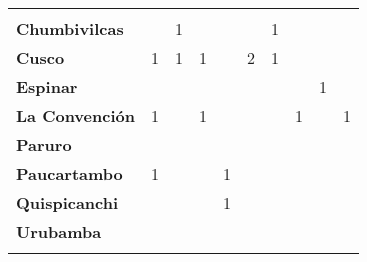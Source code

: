 \begin{tabular}{lccccccccc}
	&\cellcolor[HTML]{FCC46C}\\
	\textbf{Chumbivilcas}                      												
	&\cellcolor[HTML]{FCC46C}
	&1											&\cellcolor[HTML]{FCC46C}
	&\cellcolor[HTML]{FCC46C}					&\cellcolor[HTML]{FCC46C}
	&1											&\cellcolor[HTML]{FCC46C}
	&\cellcolor[HTML]{FCC46C}					&\cellcolor[HTML]{FCC46C}\\
	\textbf{Cusco}                            							
	&1
	&1											&1
	&\cellcolor[HTML]{FCC46C}					&2
	&1											&\cellcolor[HTML]{FCC46C}
	&\cellcolor[HTML]{FCC46C}					&\cellcolor[HTML]{FCC46C}\\
	\textbf{Espinar}       					             									&\cellcolor[HTML]{FCC46C} 					&\cellcolor[HTML]{FCC46C}					&\cellcolor[HTML]{FCC46C}					&\cellcolor[HTML]{FCC46C}					&\cellcolor[HTML]{FCC46C}					&\cellcolor[HTML]{FCC46C}					&\cellcolor[HTML]{FCC46C}					&1					&\cellcolor[HTML]{FCC46C}\\
	\textbf{La Convención}                      					
	&1											&\cellcolor[HTML]{FCC46C}					&1											&\cellcolor[HTML]{FCC46C}					&\cellcolor[HTML]{FCC46C}					&\cellcolor[HTML]{FCC46C}					&1											&\cellcolor[HTML]{FCC46C}
	&1\\
	\textbf{Paruro}                            					
	&\cellcolor[HTML]{FCC46C}					&\cellcolor[HTML]{FCC46C}					&\cellcolor[HTML]{FCC46C}					&\cellcolor[HTML]{FCC46C}					&\cellcolor[HTML]{FCC46C}					&\cellcolor[HTML]{FCC46C}					&\cellcolor[HTML]{FCC46C}					&\cellcolor[HTML]{FCC46C}
	&\cellcolor[HTML]{FCC46C}\\
	\textbf{Paucartambo}               		                       			
	&1											&\cellcolor[HTML]{FCC46C}					&\cellcolor[HTML]{FCC46C}					&1											&\cellcolor[HTML]{FCC46C}					&\cellcolor[HTML]{FCC46C}					&\cellcolor[HTML]{FCC46C}					&\cellcolor[HTML]{FCC46C}
	&\cellcolor[HTML]{FCC46C}\\
	\textbf{Quispicanchi}                                         	      					
	&\cellcolor[HTML]{FCC46C}
	&\cellcolor[HTML]{FCC46C}					&\cellcolor[HTML]{FCC46C}
	&1											&\cellcolor[HTML]{FCC46C}
	&\cellcolor[HTML]{FCC46C} 					&\cellcolor[HTML]{FCC46C}
	&\cellcolor[HTML]{FCC46C}					&\cellcolor[HTML]{FCC46C}\\
	\textbf{Urubamba}                                                      	
	&\cellcolor[HTML]{FCC46C}					&\cellcolor[HTML]{FCC46C}					&\cellcolor[HTML]{FCC46C} 					&\cellcolor[HTML]{FCC46C}					&\cellcolor[HTML]{FCC46C}					&\cellcolor[HTML]{FCC46C}					&\cellcolor[HTML]{FCC46C}					&\cellcolor[HTML]{FCC46C}
	&\cellcolor[HTML]{FCC46C}\\	
	&\multicolumn{1}{l}{}                       &\multicolumn{1}{l}{}            &\multicolumn{1}{l}{}                         
	&\multicolumn{1}{l}{}                       &\multicolumn{1}{l}{}            &\multicolumn{1}{l}{}                       &\multicolumn{1}{l}{}                       &\multicolumn{1}{l}{}            			&\multicolumn{1}{l}{}    
\end{tabular}